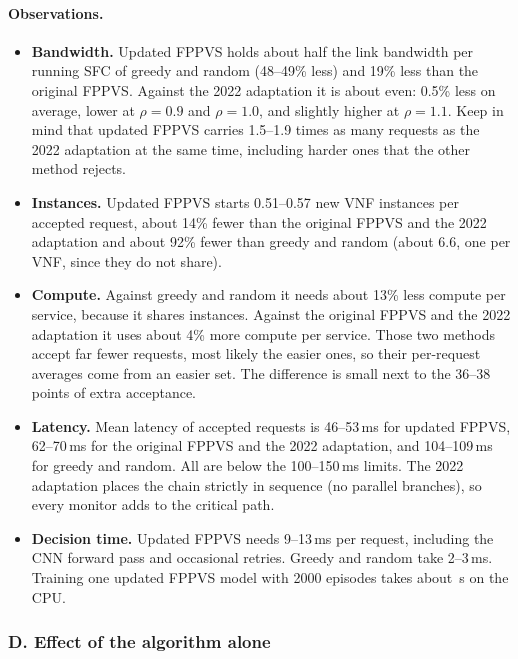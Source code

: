 \paragraph{Observations.}
\begin{itemize}
  \item \textbf{Bandwidth.} Updated FPPVS holds about half the link bandwidth per
  running SFC of greedy and random (48--49\% less) and 19\% less than the
  original FPPVS. Against the 2022 adaptation it is about even: 0.5\% less on
  average, lower at $\rho=0.9$ and $\rho=1.0$, and slightly higher at
  $\rho=1.1$. Keep in mind that updated FPPVS carries 1.5--1.9 times as many
  requests as the 2022 adaptation at the same time, including harder ones that
  the other method rejects.
  \item \textbf{Instances.} Updated FPPVS starts 0.51--0.57 new VNF instances per
  accepted request, about 14\% fewer than the original FPPVS and the 2022
  adaptation and about 92\% fewer than greedy and random (about 6.6, one per VNF,
  since they do not share).
  \item \textbf{Compute.} Against greedy and random it needs about 13\% less
  compute per service, because it shares instances. Against the original FPPVS
  and the 2022 adaptation it uses about 4\% more compute per service. Those two
  methods accept far fewer requests, most likely the easier ones, so their
  per-request averages come from an easier set. The difference is small next to
  the 36--38 points of extra acceptance.
  \item \textbf{Latency.} Mean latency of accepted requests is 46--53\,ms for
  updated FPPVS, 62--70\,ms for the original FPPVS and the 2022 adaptation, and
  104--109\,ms for greedy and random. All are below the 100--150\,ms limits.
  The 2022 adaptation places the chain strictly in sequence (no parallel
  branches), so every monitor adds to the critical path.
  \item \textbf{Decision time.} Updated FPPVS needs 9--13\,ms per request,
  including the CNN forward pass and occasional retries. Greedy and random take
  2--3\,ms. Training one updated FPPVS model with 2000 episodes takes about
  \trainSeconds\,s on the CPU.
\end{itemize}

\subsubsection*{D. Effect of the algorithm alone}


